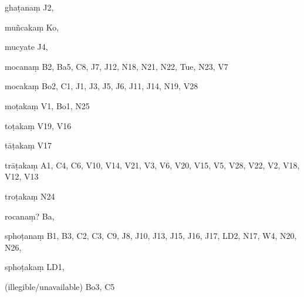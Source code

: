 \begin{ekdosis}
\begin{marma}[hp01_055]
\begin{marma}[hp02_009]
\begin{marma}[hp02_011]
\begin{marma}[hp02_33a]
\item[ghaṭanaṃ] J2, 
\item[muñcakaṃ] Ko,
\item[mucyate] J4,
\item[mocanaṃ] B2, Ba5, C8, J7, J12, N18, N21, N22, Tue, N23, V7
\item[mocakaṃ] Bo2, C1, J1, J3, J5, J6, J11, J14, N19, V28
\item[moṭakaṃ] V1, Bo1, N25 
\item[toṭakaṃ] V19, V16
\item[tāṭakaṃ] V17
\item[trāṭakaṃ] A1, C4, C6, V10, V14, V21, V3, V6, V20, V15, V5, V28, V22, V2, V18, V12, V13
\item[troṭakaṃ] N24
\item[rocanaṃ?] Ba,
\item[sphoṭanaṃ] B1, B3, C2, C3, C9, J8, J10, J13, J15, J16, J17, LD2, N17, W4, N20, N26,  
\item[sphoṭakaṃ] LD1,
\item[(illegible/unavailable)] Bo3, C5
 \begin{description}

        \end{description}
\end{marma}


\end{marma}
\end{marma}
\end{marma}
\end{ekdosis}
